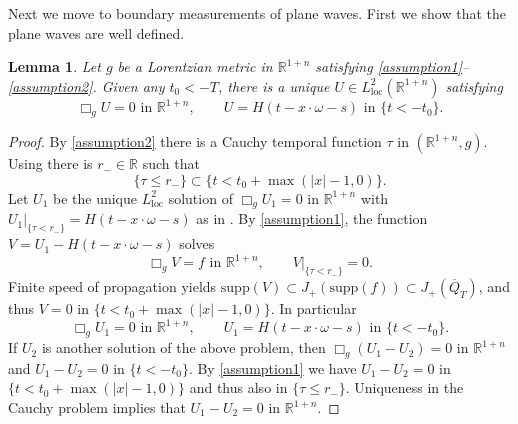 \documentclass[11pt,letterpaper]{amsart}
\newtheorem{Lemma}[Theorem]{Lemma}
\theoremstyle{definition}
\numberwithin{equation}{section}
\newcommand{\mR}{\mathbb{R}}                    %
\newcommand{\ol}[1]{\overline{#1}}
\newcommand{\supp}{\mathrm{supp}}
\def\R{\mathbb R}
\begin{document}
Next we move to boundary measurements of plane waves. First we show that the plane waves are well defined.

\begin{Lemma} \label{lemma_U_well_defined}
Let $g$ be a Lorentzian metric in $\R^{1+n}$ satisfying \eqref{assumption1}--\eqref{assumption2}. Given any $t_0 < -T$, there is a unique $U \in L^2_{\mathrm{loc}}(\mR^{1+n})$ satisfying 
\[
\Box_g U = 0 \text{ in $\mR^{1+n}$}, \qquad U = H(t - x \cdot \omega - s) \text{ in $\{ t < -t_0 \}$}.
\]
\end{Lemma}
\begin{proof}
By \eqref{assumption2} there is a Cauchy temporal function $\tau$ in $(\mR^{1+n}, g)$. Using \cite[Proposition 2.6]{oksanen2024} there is $r_- \in \mR$ such that 
\[
\{ \tau \leq r_- \} \subset \{ t < t_0 + \max(|x|-1, 0) \}.
\]
Let $U_1$ be the unique $L^2_{\mathrm{loc}}$ solution of $\Box_g U_1 = 0$ in $\mR^{1+n}$ with $U_1|_{\{\tau < r_-\}} = H(t - x \cdot \omega - s)$ as in \cite[Proposition 4.1]{oksanen2024}. By \eqref{assumption1}, the function $V = U_1 - H(t - x \cdot \omega - s)$ solves 
\[
\Box_g V = f \text{ in $\mR^{1+n}$}, \qquad V|_{\{ \tau < r_- \}} = 0.
\]
Finite speed of propagation \cite[Proposition 2.5]{oksanen2024} yields $\supp(V) \subset J_+(\supp(f)) \subset J_+(\ol{Q}_T)$, and thus $V = 0$ in $\{ t < t_0 + \max(|x|-1,0) \}$. In particular 
\[
\Box_g U_1 = 0 \text{ in $\mR^{1+n}$}, \qquad U_1 = H(t - x \cdot \omega - s) \text{ in $\{ t < -t_0 \}$}.
\]
If $U_2$ is another solution of the above problem, then $\Box_g(U_1-U_2) = 0$ in $\mR^{1+n}$ and $U_1-U_2=0$ in $\{ t < -t_0 \}$. By \eqref{assumption1} we have $U_1-U_2=0$ in $\{ t < t_0 + \max(|x|-1, 0) \}$ and thus also in $\{ \tau \leq r_- \}$. Uniqueness in the Cauchy problem implies that $U_1-U_2=0$ in $\mR^{1+n}$.
\end{proof}
\end{document}
